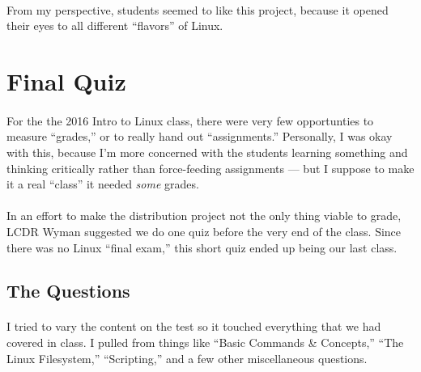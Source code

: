 \documentclass[11pt]{article}
\begin{document}
\paragraph{} From my perspective, students seemed to like this project, because it opened their eyes to all different ``flavors'' of Linux. \\

\begin{center}
		\graphicspath{ {.} }
		\centering
	\end{center}


\section{Final Quiz}

\paragraph{} For the the 2016 Intro to Linux class, there were very few opportunties to measure ``grades,'' or to really hand out ``assignments.'' Personally, I was okay with this, because I'm more concerned with the students learning something and thinking critically rather than force-feeding assignments --- but I suppose to make it a real ``class'' it needed \textit{some} grades.

\paragraph{} In an effort to make the distribution project not the only thing viable to grade, LCDR Wyman suggested we do one quiz before the very end of the class. Since there was no Linux ``final exam,'' this short quiz ended up being our last class.

\subsection{The Questions}

	\paragraph{} I tried to vary the content on the test so it touched everything that we had covered in class. I pulled from things like ``Basic Commands \& Concepts,'' ``The Linux Filesystem,'' ``Scripting,'' and a few other miscellaneous questions.
\end{document}

